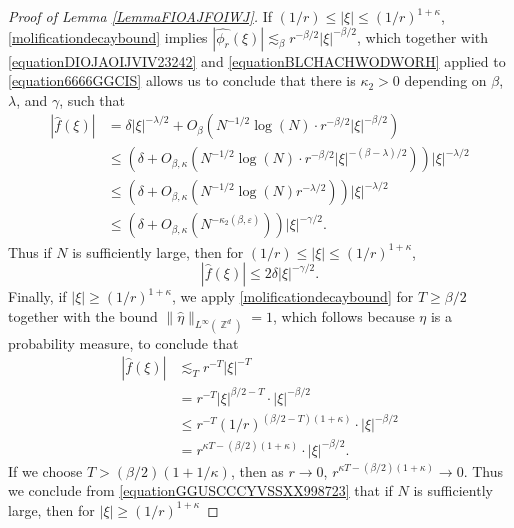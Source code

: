\documentclass[dvipsnames,letterpaper,12pt]{article}
\numberwithin{equation}{section}
\DeclareMathOperator{\ZZ}{\mathbb{Z}}
\numberwithin{theorem}{section}
\begin{document}
\begin{proof}[Proof of Lemma \ref{LemmaFIOAJFOIWJ}]
    If $(1/r) \leq |\xi| \leq (1/r)^{1+\kappa}$, \eqref{molificationdecaybound} implies $|\widehat{\phi_{r}}(\xi)| \lesssim_\beta r^{-\beta/2} |\xi|^{-\beta/2}$, which together with \eqref{equationDIOJAOIJVIV23242} and \eqref{equationBLCHACHWODWORH} applied to \eqref{equation6666GGCIS} allows us to conclude that there is $\kappa_2 > 0$ depending on $\beta$, $\lambda$, and $\gamma$, such that
    \begin{equation} \label{equationGGOOSC66341}
    \begin{split}
        |\widehat{f}(\xi)| &= \delta |\xi|^{-\lambda/2} + O_\beta \left( N^{-1/2} \log(N) \cdot r^{-\beta/2} |\xi|^{-\beta/2} \right)\\
        &\leq \left( \delta + O_{\beta,\kappa} \left( N^{-1/2} \log(N) \cdot r^{-\beta/2} |\xi|^{-(\beta - \lambda)/2} \right) \right) |\xi|^{- \lambda/2}\\
        &\leq \left( \delta + O_{\beta,\kappa} \left( N^{-1/2} \log(N) r^{-\lambda/2} \right) \right) |\xi|^{-\lambda/2}\\
        &\leq ( \delta + O_{\beta,\kappa} (N^{-\kappa_2(\beta,\varepsilon)}) ) |\xi|^{-\gamma/2}.
    \end{split}
    \end{equation}
    Thus if $N$ is sufficiently large, then for $(1/r) \leq |\xi| \leq (1/r)^{1+\kappa}$,
    \begin{equation} \label{equationaJJDIWJDIWJDIWJIDJW44141}
        |\widehat{f}(\xi)| \leq 2 \delta |\xi|^{-\gamma/2}.
    \end{equation}
    Finally, if $|\xi| \geq (1/r)^{1 + \kappa}$, we apply \eqref{molificationdecaybound} for $T \geq \beta/2$ together with the bound $\| \widehat{\eta} \|_{L^\infty(\ZZ^d)} = 1$, which follows because $\eta$ is a probability measure, to conclude that
    \begin{equation} \label{equationGGUSCCCYVSSXX998723}
    \begin{split}
        |\widehat{f}(\xi)| &\lesssim_T r^{-T} |\xi|^{-T}\\
        &= r^{-T} |\xi|^{\beta/2 - T} \cdot |\xi|^{-\beta/2}\\
        &\leq r^{-T} (1/r)^{(\beta/2 - T)(1 + \kappa)} \cdot |\xi|^{-\beta/2}\\
        &= r^{\kappa T - (\beta/2)(1 + \kappa)} \cdot |\xi|^{-\beta/2}.
    \end{split}
    \end{equation}
    If we choose $T > (\beta/2)(1 + 1/\kappa)$, then as $r \to 0$, $r^{\kappa T - (\beta/2)(1 + \kappa)} \to 0$. Thus we conclude from \eqref{equationGGUSCCCYVSSXX998723} that if $N$ is sufficiently large, then for $|\xi| \geq (1/r)^{1 + \kappa}$

\end{proof}
\end{document}
